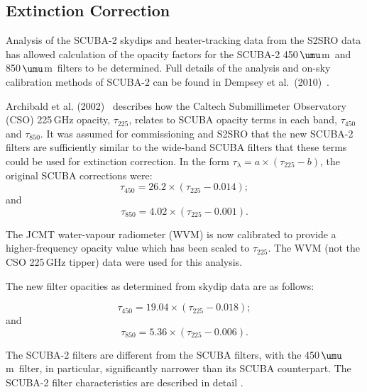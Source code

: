 \documentclass[twoside,11pt]{starlink}
\providecommand{\micron}{\mbox{\,${\umu}$m}}            %
\begin{document}
\subsection{Extinction Correction}

Analysis of the SCUBA-2 skydips and heater-tracking data from the
S2SRO data has allowed calculation of the opacity factors for the
SCUBA-2 450\micron\ and 850\micron\ filters to be determined. Full
details of the analysis and on-sky calibration methods of SCUBA-2 can
be found in Dempsey et al.\ (2010)~\cite{dempsey-spie}.

Archibald et al. (2002)~\cite{archibald} describes how the
Caltech Submillimeter Observatory (CSO) 225\,GHz opacity,
$\tau_{225}$, relates to SCUBA opacity terms in each band,
$\tau_{450}$ and $\tau_{850}$. It was assumed for commissioning and
S2SRO that the new SCUBA-2 filters are sufficiently similar to the
wide-band SCUBA filters that these terms could be used for extinction
correction. In the form $\tau_{\lambda} = a \times (\tau_{225} - b)$,
the original SCUBA corrections were:
\begin{equation}
\tau_{450} = 26.2 \times (\tau_{225} - 0.014);
\end{equation}
and
\begin{equation}
\tau_{850} = 4.02 \times (\tau_{225} - 0.001).
\end{equation}

The JCMT water-vapour radiometer (WVM) is now calibrated to provide a
higher-frequency opacity value which has been scaled to
$\tau_{225}$. The WVM (not the CSO 225\,GHz tipper) data were used for
this analysis.

The new filter opacities as determined from skydip data are as
follows:

\begin{equation}
\tau_{450} = 19.04 \times (\tau_{225} - 0.018);
\end{equation}
and
\begin{equation}
\tau_{850} = 5.36 \times (\tau_{225} - 0.006).
\end{equation}

The SCUBA-2 filters are different from the SCUBA filters, with the
450\micron\ filter, in particular, significantly narrower than its
SCUBA counterpart. The SCUBA-2 filter characteristics are described in
detail .
\end{document}
